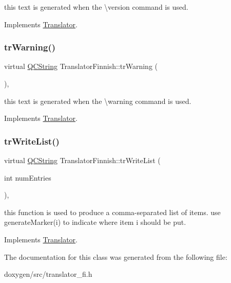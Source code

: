 this text is generated when the \textbackslash{}version command is used. 

Implements \mbox{\hyperlink{class_translator}{Translator}}.

\mbox{\label{class_translator_finnish_a28d7f7ca0e6132c1dd4188ee316750ca}} 
\subsubsection{\texorpdfstring{trWarning()}{trWarning()}}
{\footnotesize\ttfamily virtual \mbox{\hyperlink{class_q_c_string}{Q\+C\+String}} Translator\+Finnish\+::tr\+Warning (\begin{DoxyParamCaption}{ }\end{DoxyParamCaption})\hspace{0.3cm}{\ttfamily [inline]}, {\ttfamily [virtual]}}

this text is generated when the \textbackslash{}warning command is used. 

Implements \mbox{\hyperlink{class_translator}{Translator}}.

\mbox{\label{class_translator_finnish_abd69cd5ff5d26feb4f8a212cc0bf51b0}} 
\subsubsection{\texorpdfstring{trWriteList()}{trWriteList()}}
{\footnotesize\ttfamily virtual \mbox{\hyperlink{class_q_c_string}{Q\+C\+String}} Translator\+Finnish\+::tr\+Write\+List (\begin{DoxyParamCaption}\item[{int}]{num\+Entries }\end{DoxyParamCaption})\hspace{0.3cm}{\ttfamily [inline]}, {\ttfamily [virtual]}}

this function is used to produce a comma-\/separated list of items. use generate\+Marker(i) to indicate where item i should be put. 

Implements \mbox{\hyperlink{class_translator}{Translator}}.



The documentation for this class was generated from the following file\+:\begin{DoxyCompactItemize}
\item 
doxygen/src/translator\+\_\+fi.\+h\end{DoxyCompactItemize}
